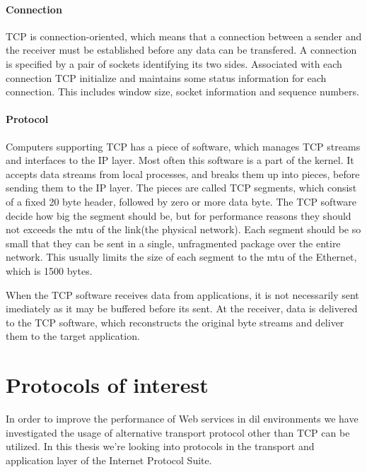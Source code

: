 \paragraph{Connection}

TCP is connection-oriented, which means that a connection between a sender and
the receiver must be established before any data can be transfered. A connection
is specified by a pair of sockets identifying its two sides. Associated with
each connection TCP initialize and maintains some status information for each
connection. This includes window size, socket information and sequence numbers.

\paragraph{Protocol}

Computers supporting TCP has a piece of software, which manages TCP streams and
interfaces to the IP layer. Most often this software is a part of the
kernel\cite{computer-networks}. It accepts data streams from local processes,
and breaks them up into pieces, before sending them to the IP layer. The pieces
are called TCP segments, which consist of a fixed 20 byte header, followed by
zero or more data byte. The TCP software decide how big the segment should be,
but for performance reasons they should not exceeds the \gls{mtu} of the
link(the physical network). Each segment should be so small that they can be
sent in a single, unfragmented package over the entire network. This usually
limits the size of each segment to the \gls{mtu} of the Ethernet, which is 1500
bytes.

When the TCP software receives data from applications, it is not necessarily
sent imediately as it may be buffered before its sent. At the receiver, data is
delivered to the TCP software, which reconstructs the original byte streams and
deliver them to the target application.


\section{Protocols of interest}


In order to improve the performance of Web services in \gls{dil} environments we
have investigated the usage of alternative transport protocol other than TCP can
be utilized. In this thesis we're looking into protocols in the transport and
application layer of the Internet Protocol Suite\cite{rfc-1122}.

